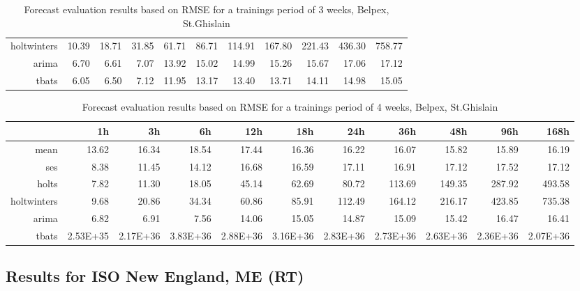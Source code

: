 \begin{landscape}
\begin{table}[ht]
\begin{tabular}{rrrrrrrrrrr}
  holtwinters & 10.39 & 18.71 & 31.85 & 61.71 & 86.71 & 114.91 & 167.80 & 221.43 & 436.30 & 758.77 \\ 
  arima & 6.70 & 6.61 & 7.07 & 13.92 & 15.02 & 14.99 & 15.26 & 15.67 & 17.06 & 17.12 \\ 
  tbats & 6.05 & 6.50 & 7.12 & 11.95 & 13.17 & 13.40 & 13.71 & 14.11 & 14.98 & 15.05 \\ 
   \hline
\end{tabular}
\caption{Forecast evaluation results based on RMSE for a trainings period of 3 weeks, Belpex, St.Ghislain}
\label{tab:app_results_stghislain_3weeks}
\end{table}
\begin{table}[hb]
\centering
\begin{tabular}{rrrrrrrrrrr}
  \hline
 & 1h & 3h & 6h & 12h & 18h & 24h & 36h & 48h & 96h & 168h \\ 
  \hline
mean & 13.62 & 16.34 & 18.54 & 17.44 & 16.36 & 16.22 & 16.07 & 15.82 & 15.89 & 16.19 \\ 
  ses & 8.38 & 11.45 & 14.12 & 16.68 & 16.59 & 17.11 & 16.91 & 17.12 & 17.52 & 17.12 \\ 
  holts & 7.82 & 11.30 & 18.05 & 45.14 & 62.69 & 80.72 & 113.69 & 149.35 & 287.92 & 493.58 \\ 
  holtwinters & 9.68 & 20.86 & 34.34 & 60.86 & 85.91 & 112.49 & 164.12 & 216.17 & 423.85 & 735.38 \\ 
  arima & 6.82 & 6.91 & 7.56 & 14.06 & 15.05 & 14.87 & 15.09 & 15.42 & 16.47 & 16.41 \\ 
  tbats & 2.53E+35 & 2.17E+36 & 3.83E+36 & 2.88E+36 & 3.16E+36 & 2.83E+36 & 2.73E+36 & 2.63E+36 & 2.36E+36 & 2.07E+36 \\ 
   \hline
\end{tabular}
\caption{Forecast evaluation results based on RMSE for a trainings period of 4 weeks, Belpex, St.Ghislain}
\label{tab:app_results_stghislain_4weeks}
\vspace*{-0.4in}
\end{table}



\subsection{Results for ISO New England, ME (RT)}



\end{landscape}
